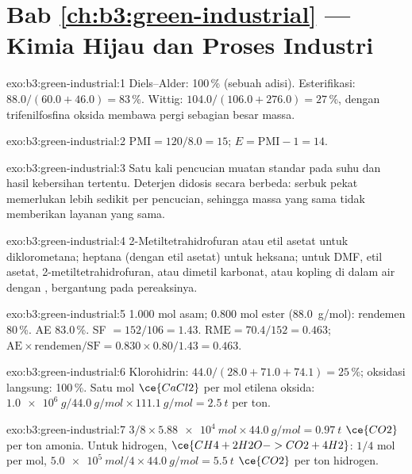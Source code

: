 \section*{Bab \ref{ch:b3:green-industrial} --- Kimia Hijau dan Proses Industri}

\begin{solution}{exo:b3:green-industrial:1}
Diels--Alder: 100\,\% (sebuah adisi). Esterifikasi: $88.0/(60.0 + 46.0) = 83$\,\%. Wittig:
$104.0/(106.0 + 276.0) = 27$\,\%, dengan trifenilfosfina oksida membawa pergi sebagian besar massa.
\end{solution}

\begin{solution}{exo:b3:green-industrial:2}
$\mathrm{PMI} = 120/8.0 = 15$; $E = \mathrm{PMI} - 1 = 14$.
\end{solution}

\begin{solution}{exo:b3:green-industrial:3}
Satu kali pencucian muatan standar pada suhu dan hasil kebersihan tertentu. Deterjen
didosis secara berbeda: serbuk pekat memerlukan lebih sedikit per pencucian, sehingga massa yang sama
tidak memberikan layanan yang sama.
\end{solution}

\begin{solution}{exo:b3:green-industrial:4}
2-Metiltetrahidrofuran atau etil asetat untuk diklorometana; heptana (dengan etil
asetat) untuk heksana; untuk DMF, etil asetat, 2-metiltetrahidrofuran, atau
dimetil karbonat, atau kopling di dalam air dengan , bergantung pada
pereaksinya.
\end{solution}

\begin{solution}{exo:b3:green-industrial:5}
1.000 mol asam; 0.800 mol ester (\qty{88.0}{g/mol}): rendemen 80\,\%. AE 83.0\,\%. SF $= 152/106 = 1.43$.
$\mathrm{RME} = 70.4/152 = 0.463$; $\mathrm{AE} \times \text{rendemen}/\mathrm{SF} = 0.830 \times 0.80/1.43 = 0.463$.
\end{solution}

\begin{solution}{exo:b3:green-industrial:6}
Klorohidrin: $44.0/(28.0 + 71.0 + 74.1) = 25$\,\%; oksidasi langsung: 100\,\%. Satu mol $\ce{CaCl2}$ per mol
etilena oksida: $\qty{1.0e6}{g}/\qty{44.0}{g/mol} \times \qty{111.1}{g/mol} = \qty{2.5}{t}$ per ton.
\end{solution}

\begin{solution}{exo:b3:green-industrial:7}
$3/8 \times \qty{5.88e4}{mol} \times \qty{44.0}{g/mol} = \qty{0.97}{t}$ $\ce{CO2}$ per ton amonia. Untuk hidrogen, $\ce{CH4 + 2H2O -> CO2 + 4H2}$:
$1/4$ mol per mol, $\qty{5.0e5}{mol}/4 \times \qty{44.0}{g/mol} = \qty{5.5}{t}$ $\ce{CO2}$ per ton hidrogen.
\end{solution}


